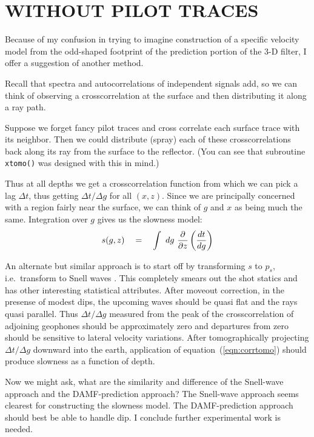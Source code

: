 \section{WITHOUT PILOT TRACES}
Because of my confusion in trying to imagine construction
of a specific velocity model from the odd-shaped footprint
of the prediction portion of the 3-D filter,
I offer a suggestion of another method.
\par
Recall that spectra and autocorrelations of independent signals add,
so we can think of observing a crosscorrelation at the surface
and then distributing it along a ray path.
\par
Suppose we forget fancy pilot traces
and cross correlate each surface trace with its neighbor.  
Then we could distribute (spray) each of these crosscorrelations
back along its ray from the surface to the reflector.
(You can see that subroutine \texttt{xtomo()}  was designed with this in mind.)
\par
Thus at all depths we get a crosscorrelation function
from which we can pick a lag $\Delta t$,
thus getting $\Delta t / \Delta g$
for all $(x,z)$.
Since we are principally concerned with a region fairly near
the surface, we can think of $g$ and $x$ as being much the same.
Integration over $g$ gives us the slowness model:
\begin{equation}
s(g,z) \quad = \quad
\int \ dg\ {\partial\over\partial z} \left(dt\over dg\right)
\label{eqn:corrtomo}
\end{equation}
\par
An alternate but similar approach is to start off
by transforming $s$ to $p_s$, i.e.~transform to Snell waves
\cite[]{Claerbout.blackwell.85}.
This completely smears out the shot statics
and has other interesting statistical attributes.
After moveout correction, in the presense of modest dips,
the upcoming waves should be quasi flat and the rays
quasi parallel.  Thus $\Delta t /\Delta g$
measured from the peak of the crosscorrelation of
adjoining geophones should be
approximately zero and departures from zero should
be sensitive to lateral velocity variations.
After tomographically projecting $\Delta t /\Delta g$
downward into the earth, application of equation~(\ref{eqn:corrtomo})
should produce slowness as a function of depth.
\par
Now we might ask, what are the similarity and difference
of the Snell-wave approach and the DAMF-prediction approach?
The Snell-wave approach seems clearest for constructing
the slowness model.
The DAMF-prediction approach should best be able to handle dip.
I conclude further experimental work is needed.

